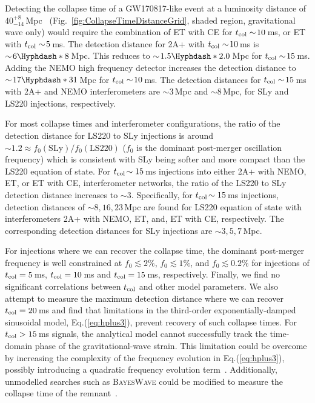 \documentclass[../Thesis.tex]{subfiles}
\begin{document}
    Detecting the collapse time of a GW170817-like event at a luminosity distance of $40^{+8}_{-14}$\,Mpc~\cite{GW170817multi} (Fig.~\ref{fig:CollapseTimeDistanceGrid}, shaded region, gravitational wave only) would require the combination of ET with CE for $t_{\mathrm{col}} \sim\!10$\,ms,  or ET with $t_{\mathrm{col}} \sim\!5$\,ms. 
    The detection distance for 2A+ with  $t_{\mathrm{col}}\sim\!10$\,ms is $\sim\!6\Hyphdash*8$\,Mpc.  
    This reduces to $\sim\!1.5\Hyphdash*2.0$\,Mpc for $t_{\mathrm{col}} \sim\!15$\,ms. 
    Adding the NEMO high frequency detector increases the detection distance to $\sim\!17\Hyphdash*31$\,Mpc  for $t_{\mathrm{col}} \sim\!10$\,ms.
    The detection distances for $t_{\mathrm{col}}\sim\!15$\,ms with 2A+ and NEMO interferometers are $\sim\!3$\,Mpc and $\sim\!8$\,Mpc, for SLy and LS220 injections, respectively.\par
    
    
    For most collapse times and interferometer configurations, the ratio of the detection distance for LS220 to SLy injections is around $\sim\!1.2\approx f_0(\mathrm{SLy}) / f_0(\mathrm{LS220})$ ($f_0$ is the dominant post-merger oscillation frequency) which is consistent with SLy being softer and more compact than the LS220 equation of state. 
    For $t_{\mathrm{col}}\!\sim15$\,ms injections into either 2A+ with NEMO, ET, or ET with CE, interferometer networks, the ratio of the LS220 to SLy detection distance increases to $\sim\!3$.
    Specifically, for $t_{\mathrm{col}}\!\sim15$\,ms injections, detection distances of $\sim\!8,16,23$\,Mpc are found for LS220 equation of state with interferometers 2A+ with NEMO, ET, and, ET with CE, respectively.
    The corresponding detection distances for SLy injections are $\sim\!3,5,7$\,Mpc. 
    \par
    For injections where we can recover the collapse time, the dominant post-merger frequency is well constrained at $f_0 \lesssim 2\%$, $f_0 \lesssim 1\%$, and $f_0 \lesssim 0.2\%$ for injections of $t_{\mathrm{col}}=5$\,ms, $t_{\mathrm{col}}=10$\,ms and $t_{\mathrm{col}}=15$\,ms, respectively. 
    Finally, we find no significant correlations between $t_{\mathrm{col}}$ and other model parameters.
    We also attempt to measure the maximum detection distance where we can recover $t_{\mathrm{col}}=20$\,ms and find that limitations in the third-order exponentially-damped sinusoidal model, Eq.(\ref{eq:hplus3}), prevent recovery of such collapse times.
    For $t_{\mathrm{col}} > 15$\,ms signals, the analytical model cannot successfully track the time-domain phase of the gravitational-wave strain.
    This limitation could be overcome by increasing the complexity of the frequency evolution in Eq.(\ref{eq:hplus3}), possibly introducing a quadratic frequency evolution term~\cite{Bose2018}.
    Additionally, unmodelled searches such as \textsc{BayesWave} could be modified to measure the collapse time of the remnant~\cite{Cornish2015,Littenberg2015,Chatziioannou2017,Torres-Rivas2019}.\par
\vspace{-0.25cm}
\end{document}
